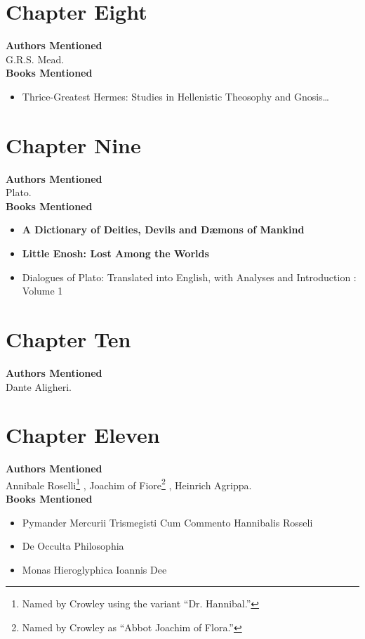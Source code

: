\documentclass[12pt,makeidx]{extreport}
\begin{document}
\section{Chapter Eight}
\textbf{Authors Mentioned}\\
G.R.S. Mead.
\\

\hspace{-1.5em}\textbf{Books Mentioned}
\begin{itemize}
\item Thrice-Greatest Hermes: Studies in Hellenistic Theosophy and Gnosis\ldots \cite{Mead1906}
\end{itemize}

\section{Chapter Nine}
\textbf{Authors Mentioned}\\
Plato.
\\

\hspace{-1.5em}\textbf{Books Mentioned}
\begin{itemize}
\item \textbf{A Dictionary of Deities, Devils and Dæmons of Mankind} \cite{St.Phalle}
\item \textbf{Little Enosh: Lost Among the Worlds} \cite{enosh}
\item Dialogues of Plato: Translated into English, with Analyses and Introduction : Volume 1 \cite{Jowett1871}
\end{itemize}

\section{Chapter Ten}
\textbf{Authors Mentioned}\\
Dante Aligheri.

\section{Chapter Eleven}
\textbf{Authors Mentioned}\\
Annibale Roselli\footnote{Named by Crowley using the variant ``Dr. Hannibal.''} , Joachim of Fiore\footnote{Named by Crowley as ``Abbot Joachim of Flora.''} , Heinrich Agrippa.
\\

\hspace{-1.5em}\textbf{Books Mentioned}
\begin{itemize}
\item Pymander Mercurii Trismegisti Cum Commento Hannibalis Rosseli \cite{Rosselli1585}
\item De Occulta Philosophia \cite{Nettesheim1565}
\item Monas Hieroglyphica Ioannis Dee \cite{Dee1564}
\end{itemize}
\end{document}
